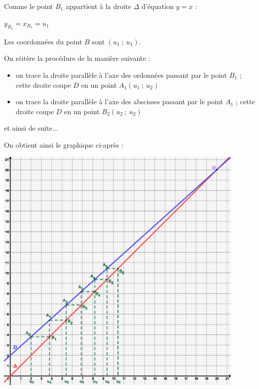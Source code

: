 \begin{corrige}
\begin{enumerate}
          \par
          Comme le point $B_1$ appartient à la droite $\Delta$ d'équation $y=x$ :
          \par
          $y_{B_1}=x_{B_1}=u_1$
          \par
          Les coordonnées du point $B$ sont $(u_1~;~u_1)$.
          \par
          On réitère la procédure de la manière suivante :
          \par
          \begin{itemize}
               \item
               on trace la droite parallèle à l'axe des ordonnées passant par le point $B_1$ ; cette droite coupe $D$ en un point $A_1(u_1~;~u_2)$
               \item
               on trace la droite parallèle à l'axe des abscisses passant par le point  $A_1$ ; cette droite coupe $D$ en un point $B_2(u_2~;~u_2)$
               \par
          \end{itemize}
          \par
          et ainsi de suite...
          \par
          On obtient ainsi le graphique ci-après :
          \begin{center}
               \begin{extern}%
                    \includegraphics[width=0.9\textwidth]{images/BBESL-s3-2-2.eps}%

\end{extern}
\end{center}
\end{enumerate}
\end{corrige}

